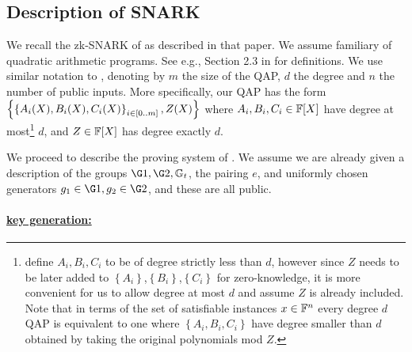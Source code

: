 \documentclass[11pt]{article}
\numberwithin{equation}{section} %
\numberwithin{figure}{section} %
\newcommand{\set}[1]{\ensuremath{\left\{#1\right\}}\xspace}
\begin{document}
\subsection{Description of \cite{BCTV} SNARK}\label{subsec:bctv}

We recall the zk-SNARK of \cite{BCTV} as described in that paper.
We assume familiary of quadratic arithmetic programs.
See e.g., Section 2.3 in \cite{groth16} for definitions.
We use similar notation to \cite{BCTV}, denoting by $m$ the size of the QAP, $d$ the degree and $n$ the number of public inputs.
More specifically, our QAP has the form \set{\sett{A_i(X),B_i(X),C_i(X)}{i\in [0..m]}, Z(X)}
where $A_i,B_i,C_i\in \mathbb F[X]$ have degree at most\footnote{\cite{BCTV} define $A_i,B_i,C_i$ to be of degree strictly less than $d$, however since $Z$ needs to be later added to \set{A_i},\set{B_i},\set{C_i} for zero-knowledge, it is more convenient for us to allow degree at most $d$ and assume $Z$ is already included. Note that in terms of the set of satisfiable instances $x\in \mathbb F^n$ every degree $d$ QAP is equivalent to one where \set{A_i,B_i,C_i} have degree smaller than $d$ obtained by taking the original polynomials mod $Z$.} $d$, and $Z\in \mathbb F[X]$ has degree exactly $d$.


We proceed to describe the proving system of \cite{BCTV}.
We assume we are already given a description of the groups $\G1,\G2,\Gt$, the pairing $e$, and uniformly chosen generators 
$g_1\in \G1,g_2\in \G2$, and these are all public.
\paragraph{\underline{\bctv key generation:}}
\end{document}
